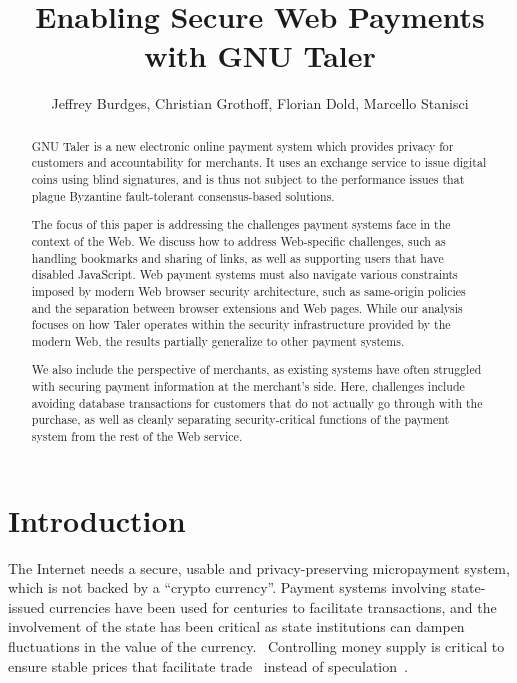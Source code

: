 \documentclass{llncs}
\date{}
\begin{document}
\title{Enabling Secure Web Payments with GNU Taler}


\author{Jeffrey Burdges,
Christian Grothoff,
Florian Dold,
Marcello Stanisci}

\maketitle




\begin{abstract}
GNU Taler is a new electronic online payment system which provides
privacy for customers and accountability for merchants. It uses an
exchange service to issue digital coins using blind signatures,
and is thus not subject to the performance issues that plague
Byzantine fault-tolerant consensus-based solutions.

The focus of this paper is addressing the challenges payment systems
face in the context of the Web.  We discuss how to address
Web-specific challenges, such as handling bookmarks and sharing of
links, as well as supporting users that have disabled JavaScript.  Web
payment systems must also navigate various constraints imposed by
modern Web browser security architecture, such as same-origin policies
and the separation between browser extensions and Web pages.  While
our analysis focuses on how Taler operates within the security
infrastructure provided by the modern Web, the results partially
generalize to other payment systems.

We also include the perspective of merchants, as existing systems have
often struggled with securing payment information at the merchant's
side.  Here, challenges include avoiding database transactions for
customers that do not actually go through with the purchase, as well
as cleanly separating security-critical functions of the payment
system from the rest of the Web service.
\end{abstract}

\section{Introduction}

The Internet needs a secure, usable and privacy-preserving
micropayment system, which is not backed by a ``crypto currency''.
Payment systems involving state-issued currencies have been used for
centuries to facilitate transactions, and the involvement of the state
has been critical as state institutions can dampen fluctuations in the
value of the currency.~\cite{dominguez1993} Controlling money supply
is critical to ensure stable prices that facilitate
trade~\cite{quantitytheory1997volckart} instead of speculation~\cite{lewis_btc_is_junk}.
\end{document}
